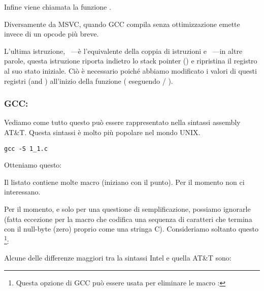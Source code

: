 Infine viene chiamata la funzione \printf.

Diversamente da MSVC, quando GCC compila senza ottimizzazione emette  invece di un opcode più breve.

L'ultima istruzione, \LEAVE~---è l'equivalente della coppia di istruzioni  e  ~---in altre parole, questa istruzione riporta indietro lo \gls{stack pointer} (\ESP) e ripristina il registro \EBP al suo stato iniziale.
Ciò è necessario poiché abbiamo modificato i valori di questi registri (\ESP and \EBP) all'inizio della funzione ( eseguendo  / ).

\subsubsection{GCC: \ATTSyntax}
\label{ATT_syntax}

Vediamo come tutto questo può essere rappresentato nella sintassi assembly AT\&T.
Questa sintassi è molto più popolare nel mondo UNIX.

\begin{lstlisting}[caption=compiliamo in GCC 4.7.3]
gcc -S 1_1.c
\end{lstlisting}

Otteniamo questo:



Il listato contiene molte macro (iniziano con il punto). Per il momento non ci interessano.

Per il momento, e solo per una questione di semplificazione, possiamo ignorarle (fatta eccezione per la macro  che codifica una sequenza di caratteri che termina con il null-byte (zero) proprio come una stringa C). Consideriamo soltanto questo
\footnote{Questa opzione di GCC può essere usata per eliminare le macro : }:



\myindex{\ATTSyntax}
\myindex{\IntelSyntax}
Alcune delle differenze maggiori tra la sintassi Intel e quella AT\&T sono:


